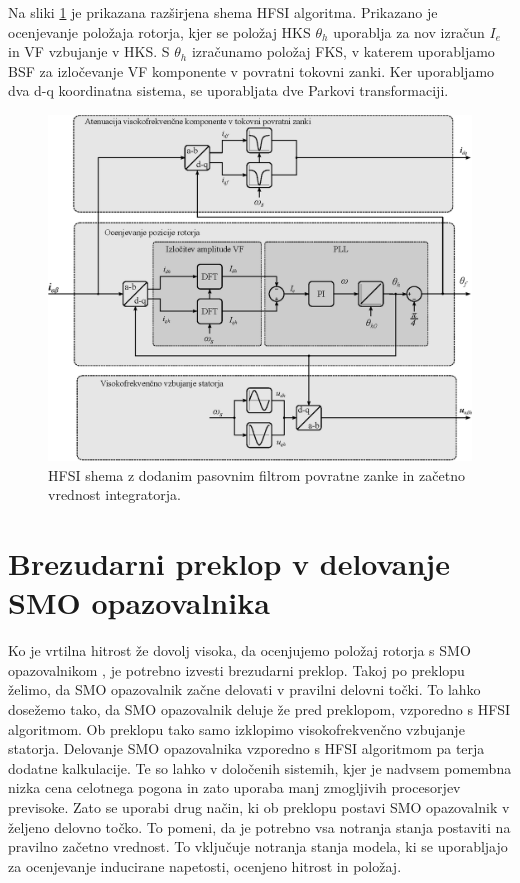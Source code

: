 \documentclass[a4paper,twoside,openright,12pt,slovene]{book}
\begin{document}
\newpage

Na sliki \ref{HFSI} je prikazana razširjena shema HFSI algoritma. Prikazano je ocenjevanje položaja rotorja, kjer se položaj HKS $\theta_h$ uporablja za nov izračun $I_e$ in VF vzbujanje v HKS. S
$\theta_h$ izračunamo položaj FKS, v katerem uporabljamo BSF za izločevanje VF komponente v povratni tokovni zanki. Ker uporabljamo dva d-q koordinatna sistema, se uporabljata dve Parkovi
transformaciji.

\begin{figure}[!htbp]
    \centering
    \includegraphics[width=0.95\columnwidth]{Slike/Inkscape/HFSI.eps}
    \caption{\label{HFSI} HFSI shema z dodanim pasovnim filtrom povratne zanke in začetno vrednost integratorja. }
\end{figure}

\newpage

\section{Brezudarni preklop v delovanje SMO opazovalnika}


Ko je vrtilna hitrost že dovolj visoka, da ocenjujemo položaj rotorja s SMO opazovalnikom \cite{9400421}, je potrebno izvesti brezudarni preklop. Takoj po preklopu želimo, da SMO opazovalnik začne
delovati v pravilni delovni točki. To lahko dosežemo tako, da SMO opazovalnik deluje že pred preklopom, vzporedno s HFSI algoritmom. Ob preklopu tako samo izklopimo visokofrekvenčno vzbujanje
statorja. Delovanje SMO opazovalnika vzporedno s HFSI algoritmom pa terja dodatne kalkulacije. Te so lahko v določenih sistemih, kjer je nadvsem pomembna nizka cena celotnega pogona in zato uporaba
manj zmogljivih procesorjev previsoke. Zato se uporabi drug način, ki ob preklopu postavi SMO opazovalnik v željeno delovno točko. To pomeni, da je potrebno vsa notranja stanja postaviti na pravilno
začetno vrednost. To vključuje notranja stanja modela, ki se uporabljajo za ocenjevanje inducirane napetosti, ocenjeno hitrost in položaj.
\end{document}
